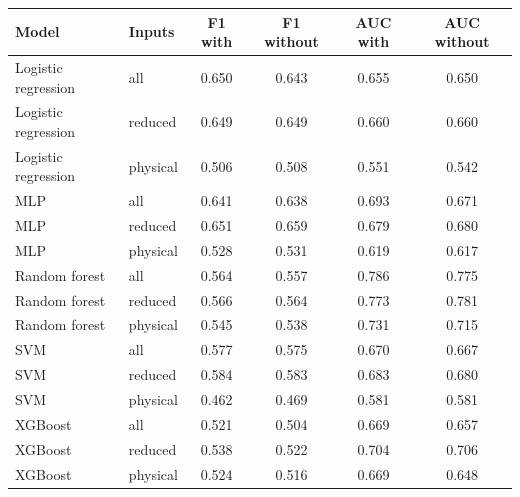\begin{tabular}{llcccc}
\toprule
Model & Inputs & F1 with & F1 without & AUC with & AUC without \\
\midrule
Logistic regression & all & 0.650 & 0.643 & 0.655 & 0.650 \\
Logistic regression & reduced & 0.649 & 0.649 & 0.660 & 0.660 \\
Logistic regression & physical & 0.506 & 0.508 & 0.551 & 0.542 \\
MLP & all & 0.641 & 0.638 & 0.693 & 0.671 \\
MLP & reduced & 0.651 & 0.659 & 0.679 & 0.680 \\
MLP & physical & 0.528 & 0.531 & 0.619 & 0.617 \\
Random forest & all & 0.564 & 0.557 & 0.786 & 0.775 \\
Random forest & reduced & 0.566 & 0.564 & 0.773 & 0.781 \\
Random forest & physical & 0.545 & 0.538 & 0.731 & 0.715 \\
SVM & all & 0.577 & 0.575 & 0.670 & 0.667 \\
SVM & reduced & 0.584 & 0.583 & 0.683 & 0.680 \\
SVM & physical & 0.462 & 0.469 & 0.581 & 0.581 \\
XGBoost & all & 0.521 & 0.504 & 0.669 & 0.657 \\
XGBoost & reduced & 0.538 & 0.522 & 0.704 & 0.706 \\
XGBoost & physical & 0.524 & 0.516 & 0.669 & 0.648 \\
\bottomrule
\end{tabular}
